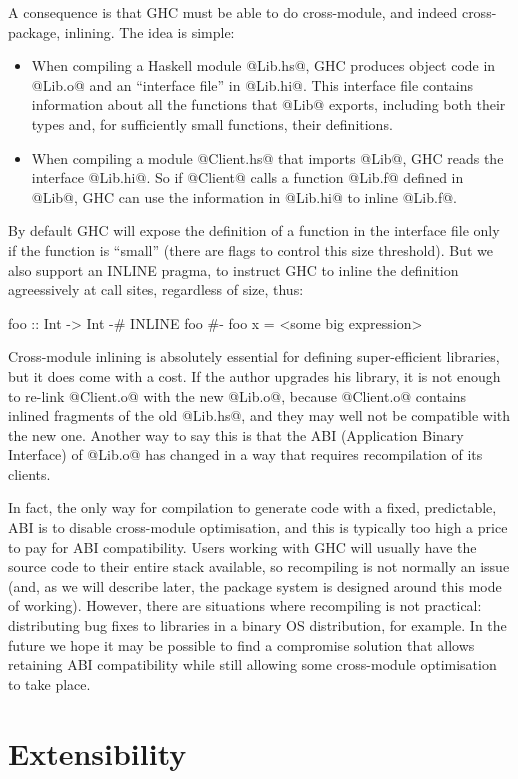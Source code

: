 \documentclass{article}
\begin{document}
A consequence is that GHC must be able to do cross-module, and indeed
cross-package, inlining.  The idea is simple:
\begin{itemize}
\item When compiling a Haskell module @Lib.hs@, GHC produces object code
in @Lib.o@ and an ``interface file'' in @Lib.hi@.  This interface file
contains information about all the functions that @Lib@ exports, including
both their types and, for sufficiently small functions, their definitions.
\item When compiling a module @Client.hs@ that imports @Lib@, GHC reads the
interface @Lib.hi@.  So if @Client@ calls a function @Lib.f@ defined in @Lib@,
GHC can use the information in @Lib.hi@ to inline @Lib.f@.
\end{itemize}
By default GHC will expose the definition of a function in the
interface file only if the function is ``small'' (there are flags to
control this size threshold).  But we also support an INLINE pragma, to
instruct GHC to inline the definition
agreessively at call sites, regardless of size, thus:
\begin{code}
foo :: Int -> Int 
{-# INLINE foo #-}
foo x = <some big expression>
\end{code}
Cross-module inlining is absolutely essential for defining super-efficient
libraries, but it does come with a cost.  If the author 
upgrades his library, it is not enough to re-link @Client.o@ with the 
new @Lib.o@, because @Client.o@ contains inlined fragments of the old
@Lib.hs@, and they may well not be compatible with the new one.
Another way to say this is that the ABI (Application Binary Interface)
of @Lib.o@ has changed in a way that requires recompilation of its clients.

In fact, the only way for compilation to generate code with a fixed,
predictable, ABI is to disable cross-module optimisation, and this is
typically too high a price to pay for ABI compatibility.  Users
working with GHC will usually have the source code to their entire
stack available, so recompiling is not normally an issue (and, as we
will describe later, the package system is designed around this mode
of working).  However, there are situations where recompiling is not
practical: distributing bug fixes to libraries in a binary OS
distribution, for example.  In the future we hope it may be possible
to find a compromise solution that allows retaining ABI compatibility
while still allowing some cross-module optimisation to take place.

\section{Extensibility}
\end{document}
